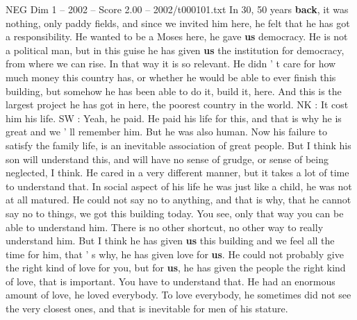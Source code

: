 \begin{textsample}{NEG Dim 1 – 2002 – Score 2.00 – 2002/t000101.txt}
In 30, 50 years \textbf{back}, it was nothing, only paddy fields, and since we invited him here, he felt that he has got a responsibility.
He wanted to be a Moses here, he gave \textbf{us} democracy.
He is not a political man, but in this guise he has given \textbf{us} the institution for democracy, from where we can rise.
In that way it is so relevant.
He didn ' t care for how much money this country has, or whether he would be able to ever finish this building, but somehow he has been able to do it, build it, here.
And this is the largest project he has got in here, the poorest country in the world.
NK : It cost him his life.
SW : Yeah, he paid.
He paid his life for this, and that is why he is great and we ' ll remember him.
But he was also human.
Now his failure to satisfy the family life, is an inevitable association of great people.
But I think his son will understand this, and will have no sense of grudge, or sense of being neglected, I think.
He cared in a very different manner, but it takes a lot of time to understand that.
In social aspect of his life he was just like a child, he was not at all matured.
He could not say no to anything, and that is why, that he cannot say no to things, we got this building today.
You see, only that way you can be able to understand him.
There is no other shortcut, no other way to really understand him.
But I think he has given \textbf{us} this building and we feel all the time for him, that ' s why, he has given love for \textbf{us}.
He could not probably give the right kind of love for you, but for \textbf{us}, he has given the people the right kind of love, that is important.
You have to understand that.
He had an enormous amount of love, he loved everybody.
To love everybody, he sometimes did not see the very closest ones, and that is inevitable for men of his stature.

\end{textsample}
